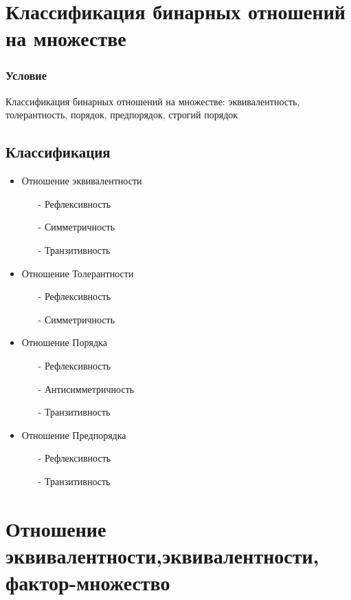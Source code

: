 \documentclass{report}
\begin{document}
\section{Классификация бинарных отношений на множестве}
\subsubsection{Условие}
Классификация бинарных отношений на множестве: эквивалентность, толерантность,
порядок, предпорядок, строгий порядок
\subsection{Классификация}
\begin{itemize}
	\item Отношение эквивалентности
	      \begin{itemize}
		      \item[-] Рефлексивность
		      \item[-] Симметричность
		      \item[-] Транзитивность
	      \end{itemize}
	\item Отношение Толерантности
	      \begin{itemize}
		      \item[-] Рефлексивность
		      \item[-] Симметричность
	      \end{itemize}
	\item Отношение Порядка
	      \begin{itemize}
		      \item[-] Рефлексивность
		      \item[-] Антисимметричность
		      \item[-] Транзитивность
	      \end{itemize}
	\item Отношение Предпорядка
	      \begin{itemize}
		      \item[-] Рефлексивность
		      \item[-] Транзитивность
	      \end{itemize}
\end{itemize}

\newpage

\section{Отношение эквивалентности, эквивалентности, фактор-множество}
\end{document}
